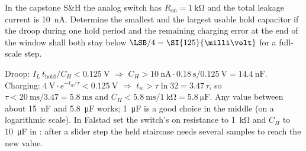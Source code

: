 In the capstone S\&H the analog switch has $R_\mathrm{on}=\SI{1}{\kilo\ohm}$
and the total leakage current is \SI{10}{\nano\ampere}. Determine the
smallest and the largest usable hold capacitor if the droop during one
hold period and the remaining charging error at the end of the window
shall both stay below $\LSB/4 = \SI{125}{\milli\volt}$ for a full-scale
step.

\begin{solution}
Droop: $I_L\,t_\mathrm{hold}/C_H < \SI{0.125}{\volt}$ $\Rightarrow$
$C_H > \SI{10}{\nano\ampere}\cdot\SI{0.18}{\second}/\SI{0.125}{\volt} = \SI{14.4}{\nano\farad}$.
Charging: $\SI{4}{\volt}\cdot e^{-t_w/\tau} < \SI{0.125}{\volt}$
$\Rightarrow$ $t_w > \tau\ln 32 = 3.47\,\tau$, so
$\tau < \SI{20}{\milli\second}/3.47 = \SI{5.8}{\milli\second}$ and
$C_H < \SI{5.8}{\milli\second}/\SI{1}{\kilo\ohm} = \SI{5.8}{\micro\farad}$.
Any value between about \SI{15}{\nano\farad} and \SI{5.8}{\micro\farad}
works; \SI{1}{\micro\farad} is a good choice in the middle (on a
logarithmic scale). In Falstad set the switch's on resistance to
\SI{1}{\kilo\ohm} and $C_H$ to \SI{10}{\micro\farad} in
: after a slider step the held staircase needs several
samples to reach the new value.
\end{solution}

